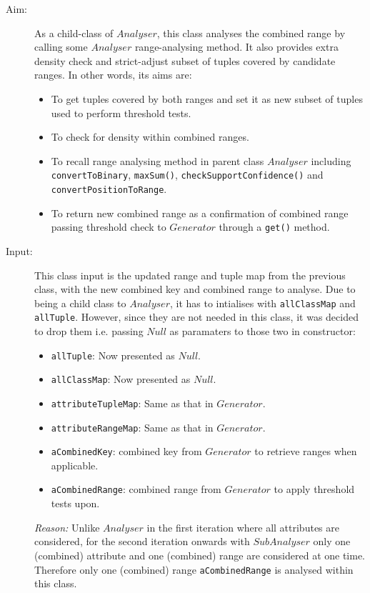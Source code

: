 \begin{description}

\item[Aim: ] As a child-class of $Analyser$, this class analyses the combined range by calling some $Analyser$ range-analysing method. It also provides extra density check and strict-adjust subset of tuples covered by candidate ranges. In other words, its aims are:
\begin{itemize}
	\item{To get tuples covered by both ranges and set it as new subset of tuples used to perform threshold tests.}
	\item{To check for density within combined ranges.} 
	\item{To recall range analysing method in parent class $Analyser$ including \texttt{convertToBinary}, \texttt{maxSum()}, \texttt{checkSupportConfidence()} and \texttt{convertPositionToRange}.} 
	\item{To return new combined range as a confirmation of combined range passing threshold check to $Generator$ through a \texttt{get()} method.}
\end{itemize}

\item[Input: ] This class input is the updated range and tuple map from the previous class, with the new combined key and combined range to analyse. Due to being a child class to $Analyser$, it has to intialises with \texttt{allClassMap} and \texttt{allTuple}. However, since they are not needed in this class, it was decided to drop them i.e. passing $Null$ as paramaters to those two in constructor:
\begin{itemize}
	\item{\texttt{allTuple}:  Now presented as $Null$.} 
	\item{\texttt{allClassMap}: Now presented as $Null$.}
	\item{\texttt{attributeTupleMap}: Same as that in $Generator$.}
	\item{\texttt{attributeRangeMap}: Same as that in $Generator$.}
	\item{\texttt{aCombinedKey}: combined key from $Generator$ to retrieve ranges when applicable.}
	\item{\texttt{aCombinedRange}: combined range from $Generator$ to apply threshold tests upon.}
\end{itemize}

\textit{Reason: } Unlike $Analyser$ in the first iteration where all attributes are considered, for the second iteration onwards with $SubAnalyser$ only one (combined) attribute and one (combined) range are considered at one time. Therefore only one (combined) range \texttt{aCombinedRange} is analysed within this class.


\end{description}

